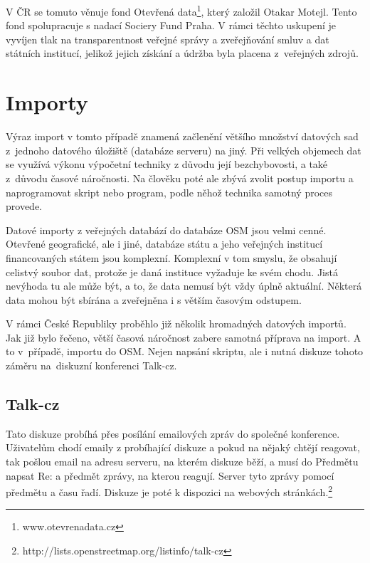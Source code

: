 V ČR se tomuto věnuje fond Otevřená data\footnote{www.otevrenadata.cz}, který založil Otakar
Motejl. Tento fond spolupracuje s nadací Sociery Fund Praha. V rámci
těchto uskupení je vyvíjen tlak na transparentnost veřejné správy a
zveřejňování smluv a dat
státních institucí, jelikož jejich získání a údržba byla placena
z~veřejných zdrojů.



\section{Importy}
\label{Importy}
Výraz import v tomto případě znamená začlenění většího množství datových sad
z~jednoho datového úložiště (databáze serveru) na jiný. Při velkých objemech dat
se využívá výkonu výpočetní techniky z důvodu její bezchybovosti, a také
z~důvodu časové náročnosti. Na člověku poté ale zbývá zvolit postup importu
a naprogramovat skript nebo program, podle něhož technika samotný proces
provede. 

Datové importy z veřejných databází do databáze OSM jsou velmi cenné. 
Otevřené geografické, ale i jiné, databáze státu a jeho veřejných institucí 
financovaných státem jsou komplexní. Komplexní v tom smyslu, že obsahují celistvý
soubor dat, protože je daná instituce vyžaduje ke svém chodu. Jistá nevýhoda tu 
ale může být, a to, že data nemusí být vždy úplně aktuální. Některá data mohou 
být sbírána a zveřejněna i s větším časovým odstupem.

V rámci České Republiky proběhlo již několik hromadných datových importů. Jak 
již bylo řečeno, větší časová náročnost zabere samotná příprava na import. A to
v~případě, importu do OSM. Nejen napsání skriptu, ale i nutná diskuze tohoto záměru
na~diskuzní konferenci Talk-cz. 

\subsection{Talk-cz}
\label{Talk-cz}
Tato diskuze probíhá přes posílání emailových zpráv do společné konference. 
Uživatelům chodí emaily z probíhající diskuze a pokud na nějaký chtějí reagovat,
tak pošlou email na adresu serveru, na kterém diskuze běží, a musí do Předmětu 
napsat Re: a předmět zprávy, na kterou reagují. Server tyto zprávy pomocí 
předmětu a času řadí. Diskuze je poté k dispozici na webových stránkách.\footnote{http://lists.openstreetmap.org/listinfo/talk-cz}

